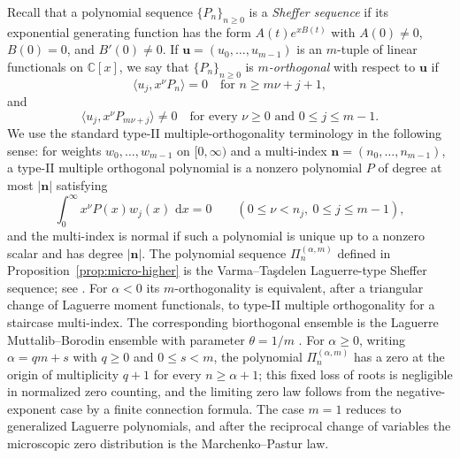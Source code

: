 \documentclass[reqno]{article}
\theoremstyle{definition}
\theoremstyle{remark}
\theoremstyle{plain}
\newcommand{\C}{\mathbb C}
\newcommand{\dd}{\,\mathrm d}
\begin{document}
Recall that a polynomial sequence $\{P_n\}_{n\ge0}$ is a \emph{Sheffer sequence} if its exponential generating function has the form $A(t)e^{xB(t)}$ with $A(0)\ne0$, $B(0)=0$, and $B'(0)\ne0$. If $\mathbf u=(u_0,\dots,u_{m-1})$ is an $m$-tuple of linear functionals on $\C[x]$, we say that $\{P_n\}_{n\ge0}$ is \emph{$m$-orthogonal} with respect to $\mathbf u$ if
$$\langle u_j,x^\nu P_n\rangle=0\quad\text{for }n\ge m\nu+j+1,$$
and
$$\langle u_j,x^\nu P_{m\nu+j}\rangle\ne0\quad\text{for every }\nu\ge0\text{ and }0\le j\le m-1.$$
We use the standard type-II multiple-orthogonality terminology in the following sense: for weights $w_0,\dots,w_{m-1}$ on $[0,\infty)$ and a multi-index $\boldsymbol n=(n_0,\dots,n_{m-1})$, a type-II multiple orthogonal polynomial is a nonzero polynomial $P$ of degree at most $|\boldsymbol n|$ satisfying
$$\int_0^\infty x^\nu P(x)w_j(x)\,\dd x=0\qquad(0\le\nu<n_j,\ 0\le j\le m-1),$$
and the multi-index is normal if such a polynomial is unique up to a nonzero scalar and has degree $|\boldsymbol n|$.
The polynomial sequence $\Pi_n^{(\alpha,m)}$ defined in Proposition~\ref{prop:micro-higher} is the Varma--Ta\c{s}delen Laguerre-type Sheffer sequence; see \cite{VT}. For $\alpha<0$ its $m$-orthogonality is equivalent, after a triangular change of Laguerre moment functionals, to type-II multiple orthogonality for a staircase multi-index. The corresponding biorthogonal ensemble is the Laguerre Muttalib--Borodin ensemble with parameter $\theta=1/m$ \cite{Borodin98,FW}. For $\alpha\ge0$, writing $\alpha=qm+s$ with $q\ge0$ and $0\le s<m$, the polynomial $\Pi_n^{(\alpha,m)}$ has a zero at the origin of multiplicity $q+1$ for every $n\ge\alpha+1$; this fixed loss of roots is negligible in normalized zero counting, and the limiting zero law follows from the negative-exponent case by a finite connection formula. The case $m=1$ reduces to generalized Laguerre polynomials, and after the reciprocal change of variables the microscopic zero distribution is the Marchenko--Pastur law.
\end{document}
